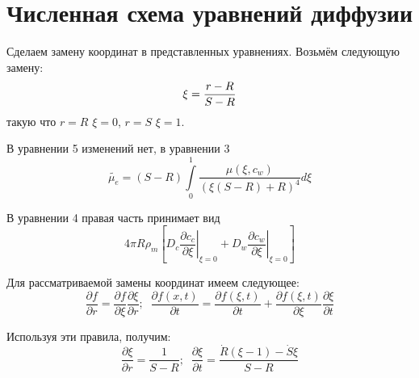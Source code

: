 \section{Численная схема уравнений диффузии}

\par Сделаем замену координат в представленных уравнениях. Возьмём следующую замену: $$\displaystyle \xi = \frac{r-R}{S-R}$$
такую что $r = R$ $\xi = 0$, $r = S$ $\xi = 1$.
\par В уравнении 5 изменений нет, в уравнении 3 $$\tilde{\mu_{e}}=(S-R)\int\limits^{1}_{0}\frac{\mu(\xi, c_{w})}{(\xi(S-R)+R)^{4}}d\xi$$
\par В уравнении 4 правая часть принимает вид $$4\pi R\rho_{m}\left[D_{c}\left.\frac{\partial c_{c}}{\partial \xi}\right|_{\xi=0}+D_{w}\left.\frac{\partial c_{w}}{\partial \xi}\right|_{\xi=0}\right]$$
\par Для рассматриваемой замены координат имеем следующее:
$$\frac{\partial f}{\partial r}=\frac{\partial f}{\partial \xi}\frac{\partial \xi}{\partial r};\;\;\frac{\partial f(x,t)}{\partial t}=\frac{\partial f(\xi,t)}{\partial t}+\frac{\partial f(\xi,t)}{\partial \xi}\frac{\partial \xi}{\partial t}$$
\par Используя эти правила, получим:
$$\frac{\partial \xi}{\partial r}=\frac{1}{S-R};\;\;\frac{\partial \xi}{\partial t}=\frac{\dot{R}(\xi -1)-\dot{S}\xi}{S-R}$$

